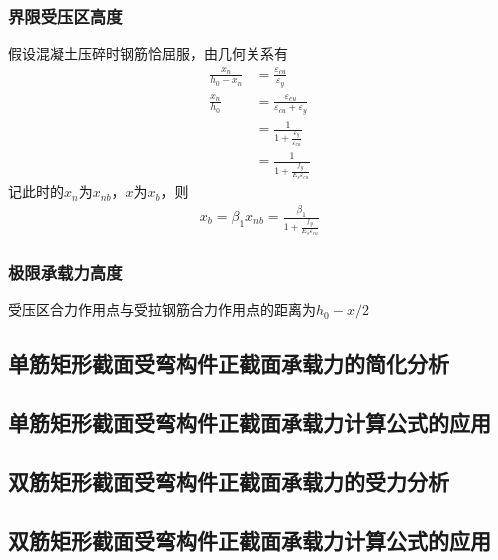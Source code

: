 \documentclass{article}
\begin{document}
\subsubsection{界限受压区高度}
\par 假设混凝土压碎时钢筋恰屈服，由几何关系有
\begin{align}
      \frac{x_n}{h_0-x_n} & = \frac{\varepsilon_{cu}}{\varepsilon_y}                  \\
      \frac{x_n}{h_0}     & = \frac{\varepsilon_{cu}}{\varepsilon_{cu}+\varepsilon_y} \\
                          & = \frac{1}{1+\frac{\varepsilon_y}{\varepsilon_{cu}}}      \\
                          & = \frac{1}{1+\frac{f_y}{E_s\varepsilon_{cu}}}
\end{align}
记此时的$x_n$为$x_{nb}$，$x$为$x_b$，则
\begin{align}
      x_b = \beta_1x_{nb}=\frac{\beta_1}{1+\frac{f_y}{E_s\varepsilon_{cu}}}
\end{align}
\subsubsection{极限承载力高度}
\par 受压区合力作用点与受拉钢筋合力作用点的距离为$h_0-x/2$
\subsection{单筋矩形截面受弯构件正截面承载力的简化分析}
\subsection{单筋矩形截面受弯构件正截面承载力计算公式的应用}
\subsection{双筋矩形截面受弯构件正截面承载力的受力分析}
\subsection{双筋矩形截面受弯构件正截面承载力计算公式的应用}
\appendix
\newpage
\newcommand{\ans}{\par \noindent \textbf{答：}}
\end{document}

